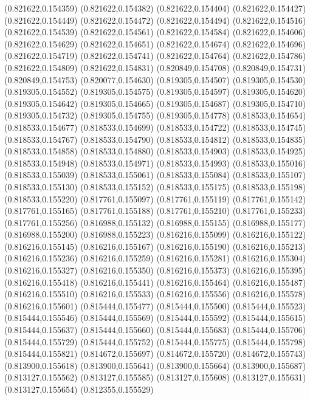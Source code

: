 (0.821622,0.154359)
(0.821622,0.154382)
(0.821622,0.154404)
(0.821622,0.154427)
(0.821622,0.154449)
(0.821622,0.154472)
(0.821622,0.154494)
(0.821622,0.154516)
(0.821622,0.154539)
(0.821622,0.154561)
(0.821622,0.154584)
(0.821622,0.154606)
(0.821622,0.154629)
(0.821622,0.154651)
(0.821622,0.154674)
(0.821622,0.154696)
(0.821622,0.154719)
(0.821622,0.154741)
(0.821622,0.154764)
(0.821622,0.154786)
(0.821622,0.154809)
(0.821622,0.154831)
(0.820849,0.154708)
(0.820849,0.154731)
(0.820849,0.154753)
(0.820077,0.154630)
(0.819305,0.154507)
(0.819305,0.154530)
(0.819305,0.154552)
(0.819305,0.154575)
(0.819305,0.154597)
(0.819305,0.154620)
(0.819305,0.154642)
(0.819305,0.154665)
(0.819305,0.154687)
(0.819305,0.154710)
(0.819305,0.154732)
(0.819305,0.154755)
(0.819305,0.154778)
(0.818533,0.154654)
(0.818533,0.154677)
(0.818533,0.154699)
(0.818533,0.154722)
(0.818533,0.154745)
(0.818533,0.154767)
(0.818533,0.154790)
(0.818533,0.154812)
(0.818533,0.154835)
(0.818533,0.154858)
(0.818533,0.154880)
(0.818533,0.154903)
(0.818533,0.154925)
(0.818533,0.154948)
(0.818533,0.154971)
(0.818533,0.154993)
(0.818533,0.155016)
(0.818533,0.155039)
(0.818533,0.155061)
(0.818533,0.155084)
(0.818533,0.155107)
(0.818533,0.155130)
(0.818533,0.155152)
(0.818533,0.155175)
(0.818533,0.155198)
(0.818533,0.155220)
(0.817761,0.155097)
(0.817761,0.155119)
(0.817761,0.155142)
(0.817761,0.155165)
(0.817761,0.155188)
(0.817761,0.155210)
(0.817761,0.155233)
(0.817761,0.155256)
(0.816988,0.155132)
(0.816988,0.155155)
(0.816988,0.155177)
(0.816988,0.155200)
(0.816988,0.155223)
(0.816216,0.155099)
(0.816216,0.155122)
(0.816216,0.155145)
(0.816216,0.155167)
(0.816216,0.155190)
(0.816216,0.155213)
(0.816216,0.155236)
(0.816216,0.155259)
(0.816216,0.155281)
(0.816216,0.155304)
(0.816216,0.155327)
(0.816216,0.155350)
(0.816216,0.155373)
(0.816216,0.155395)
(0.816216,0.155418)
(0.816216,0.155441)
(0.816216,0.155464)
(0.816216,0.155487)
(0.816216,0.155510)
(0.816216,0.155533)
(0.816216,0.155556)
(0.816216,0.155578)
(0.816216,0.155601)
(0.815444,0.155477)
(0.815444,0.155500)
(0.815444,0.155523)
(0.815444,0.155546)
(0.815444,0.155569)
(0.815444,0.155592)
(0.815444,0.155615)
(0.815444,0.155637)
(0.815444,0.155660)
(0.815444,0.155683)
(0.815444,0.155706)
(0.815444,0.155729)
(0.815444,0.155752)
(0.815444,0.155775)
(0.815444,0.155798)
(0.815444,0.155821)
(0.814672,0.155697)
(0.814672,0.155720)
(0.814672,0.155743)
(0.813900,0.155618)
(0.813900,0.155641)
(0.813900,0.155664)
(0.813900,0.155687)
(0.813127,0.155562)
(0.813127,0.155585)
(0.813127,0.155608)
(0.813127,0.155631)
(0.813127,0.155654)
(0.812355,0.155529)
